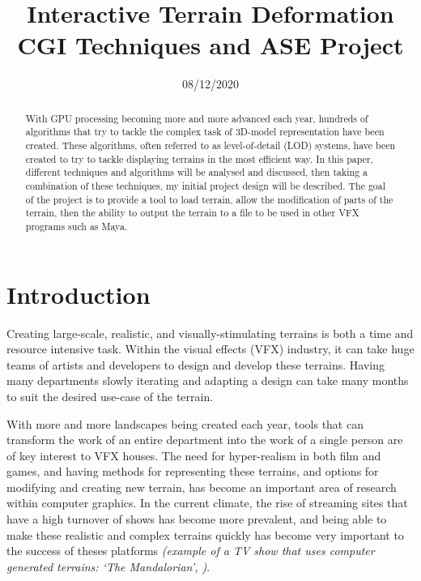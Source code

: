 \documentclass[notitlepage,12pt]{article}
\title{%
Interactive Terrain Deformation \\
\large CGI Techniques and ASE Project}
\author{}
\date{08/12/2020}
\begin{document}
\maketitle

\thispagestyle{empty}

\begin{abstract}
\noindent With GPU processing becoming more and more advanced each year, hundreds of algorithms that try to tackle the complex task of 3D-model representation have been created. These algorithms, often referred to as level-of-detail (LOD) systems, have been created to try to tackle displaying terrains in the most efficient way. In this paper, different techniques and algorithms will be analysed and discussed, then taking a combination of these techniques, my initial project design will be described. The goal of the project is to provide a tool to load terrain, allow the modification of parts of the terrain, then the ability to output the terrain to a file to be used in other VFX programs such as Maya.
\end{abstract}

\newpage
\clearpage
\setcounter{page}{1}

\section{Introduction}

Creating large-scale, realistic, and visually-stimulating terrains is both a time and resource intensive task. Within the visual effects (VFX) industry, it can take huge teams of artists and developers to design and develop these terrains. Having many departments slowly iterating and adapting a design can take many months to suit the desired use-case of the terrain.

With more and more landscapes being created each year, tools that can transform the work of an entire department into the work of a single person are of key interest to VFX houses. The need for hyper-realism in both film and games, and having methods for representing these terrains, and options for modifying and creating new terrain, has become an important area of research within computer graphics. In the current climate, the rise of streaming sites that have a high turnover of shows has become more prevalent, and being able to make these realistic and complex terrains quickly has become very important to the success of theses platforms \textit{(example of a TV show that uses computer generated terrains: `The Mandalorian', \cite{mandalorian})}.
\end{document}

